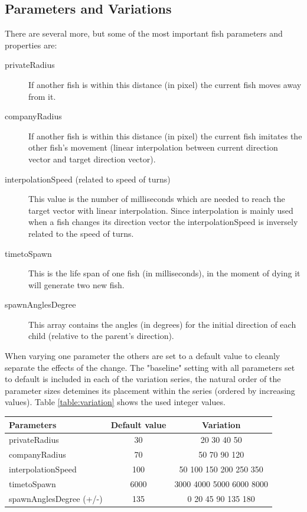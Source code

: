 \documentclass{scrartcl}
\begin{document}
\subsection{Parameters and Variations}
There are several more, but some of the most important fish parameters and properties are:
\begin{description}
\item[privateRadius] If another fish is within this distance (in pixel) the current fish moves away from it.
\item[companyRadius] If another fish is within this distance (in pixel) the current fish imitates the other fish's movement (linear interpolation between current direction vector and target direction vector).
\item[interpolationSpeed (related to speed of turns)] This value is the number of milliseconds which are needed to reach the target vector with linear interpolation. Since interpolation is mainly used when a fish changes its direction vector the interpolationSpeed is inversely related to the speed of turns.
\item[timetoSpawn] This is the life span of one fish (in milliseconds), in the moment of dying it will generate two new fish.
\item[spawnAnglesDegree] This array contains the angles (in degrees) for the initial direction of each child (relative to the parent's direction).
\end{description}

When varying one parameter the others are set to a default value to cleanly separate the effects of the change.
The "baseline" setting with all parameters set to default is included in each of the variation series, the natural order of the parameter sizes detemines its placement within the series (ordered by increasing values). Table \ref{table:variation} shows the used integer values.

\begin{center}
\begin{tabular}{ l | c | c }
  \hline                       
  Parameters 		 & Default value 	& Variation \\
  \hline
  privateRadius 	 & 30 		& 20 30 40 50 \\
  companyRadius 	 & 70 		& 50 70 90 120 \\
  interpolationSpeed & 100 		& 50 100 150 200 250 350 \\
  timetoSpawn 		 & 6000 	& 3000 4000 5000 6000 8000 \\
  spawnAnglesDegree (+/-)  & 135 	& 0 20 45 90 135 180 \\
  \hline  
\end{tabular}
\label{table:variation}
\end{center}
\end{document}
